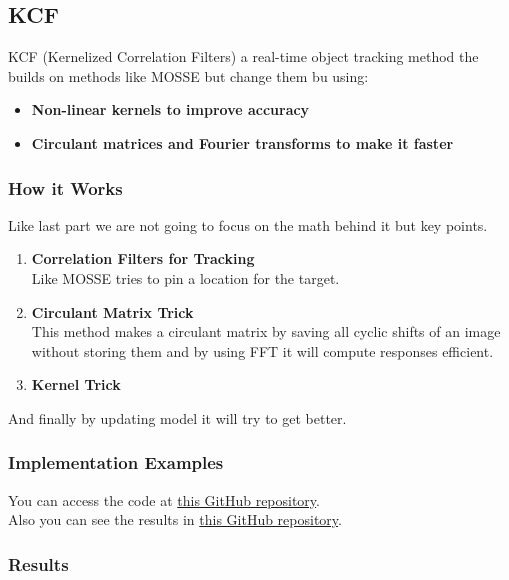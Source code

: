 \documentclass[a4paper,12pt]{article}
\begin{document}
\subsection{KCF}

KCF (Kernelized Correlation Filters) a real-time object tracking method the builds on methods like MOSSE but change them bu using:

\begin{itemize}
    \item \textbf{Non-linear kernels to improve accuracy}
    \item \textbf{Circulant matrices and Fourier transforms to make it faster}
\end{itemize}

\subsubsection{How it Works}

Like last part we are not going to focus on the math behind it but key points.

\begin{enumerate}
    \item \textbf{Correlation Filters for Tracking} \\
        Like MOSSE tries to pin a location for the target.
    \item \textbf{Circulant Matrix Trick} \\
        This method makes a circulant matrix by saving all cyclic shifts of an image without storing them and by using FFT it will compute responses efficient.
    \item \textbf{Kernel Trick}
\end{enumerate}

And finally by updating model it will try to get better.
\subsubsection{Implementation Examples}

You can access the code at \href{https://github.com/amirali83/Signal_Project_2025/tree/main/Codes/Tracking}{this GitHub repository}. \\
Also you can see the results in \href{https://github.com/amirali83/Signal_Project_2025/tree/main/Results/KCF}{this GitHub repository}.

\subsubsection{Results} 
\end{document}
